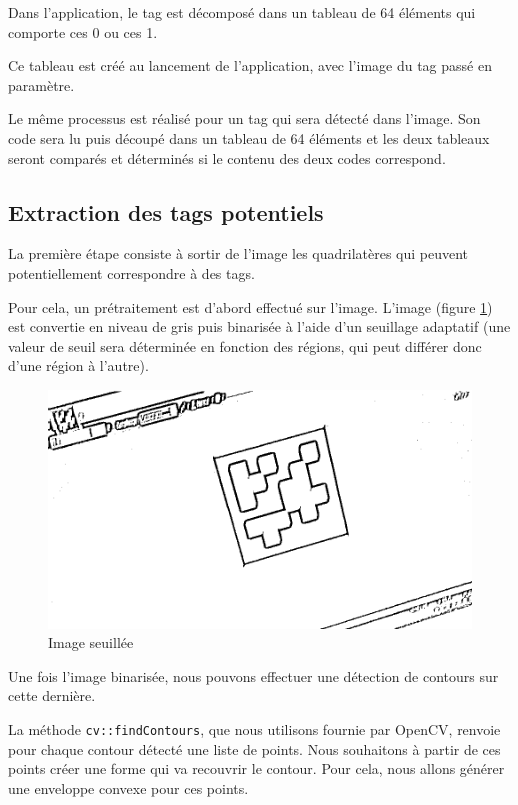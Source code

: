         Dans l'application, le tag est décomposé dans un tableau de 64 éléments qui comporte ces 0 ou ces 1.

        Ce tableau est créé au lancement de l'application, avec l'image du tag passé en paramètre.

        Le même processus est réalisé pour un tag qui sera détecté dans l'image. Son code sera lu puis découpé dans un tableau de 64 éléments et les deux tableaux seront comparés et déterminés si le contenu des deux codes correspond.  

        \subsection{Extraction des tags potentiels}

        La première étape consiste à sortir de l'image les quadrilatères qui peuvent potentiellement correspondre à des tags.

        Pour cela, un prétraitement est d'abord effectué sur l'image. L'image (figure \ref{fig:seuil}) est convertie en niveau de gris puis binarisée à l'aide d'un seuillage adaptatif (une valeur de seuil sera déterminée en fonction des régions, qui peut différer donc d'une région à l'autre).

        \begin{figure}[!h]
            \centering
            \includegraphics[scale=0.25]{img/threshold.png}
            \caption{Image seuillée}
            \label{fig:seuil}
        \end{figure}

        Une fois l'image binarisée, nous pouvons effectuer une détection de contours sur cette dernière.

        La méthode \verb|cv::findContours|, que nous utilisons fournie par OpenCV, renvoie pour chaque contour détecté une liste de points. Nous souhaitons à partir de ces points créer une forme qui va recouvrir le contour. Pour cela, nous allons générer une enveloppe convexe pour ces points.

